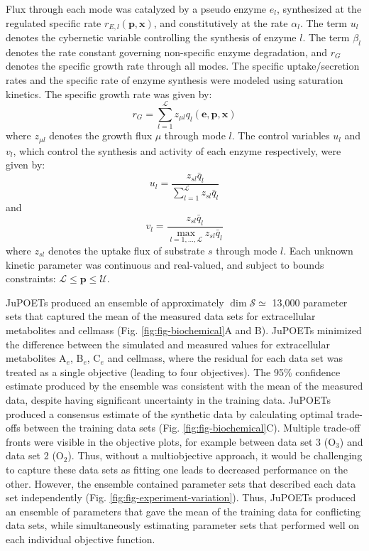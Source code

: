\documentclass{bmcart}
\begin{document}
Flux through each mode was catalyzed by a pseudo enzyme $e_{l}$, synthesized at the regulated specific rate $r_{E,l}\left(\mathbf{p},\mathbf{x}\right)$, and constitutively at the rate $\alpha_{l}$.
The term $u_{l}$ denotes the cybernetic variable controlling the synthesis of enzyme $l$.
The term $\beta_{l}$ denotes the rate constant governing non-specific enzyme degradation, and $r_{G}$ denotes the specific growth rate through all modes.
The specific uptake/secretion rates and the specific rate of enzyme synthesis were modeled using saturation kinetics.
The specific growth rate was given by:
\begin{equation}\nonumber
	r_{G}  = \sum_{l = 1}^{\mathcal{L}}z_{\mu l}q_{l}\left(\mathbf{e},\mathbf{p},\mathbf{x}\right)
\end{equation}
where $z_{\mu l}$ denotes the growth flux $\mu$ through mode $l$.
The control variables $u_{l}$ and $v_{l}$, which control the synthesis and activity of each enzyme respectively, were given by:
\begin{equation}
	u_{l} = \frac{z_{sl}\bar{q}_{l}}{\sum\limits_{l = 1}^{\mathcal{L}}z_{sl}\bar{q}_{l}}
\end{equation}
and
\begin{equation}
    v_{l} = \frac{z_{sl}\bar{q}_{l}}{\max\limits_{l=1,\hdots,\mathcal{L}}z_{sl}\bar{q}_{l}}
\end{equation}
where $z_{sl}$ denotes the uptake flux of substrate $s$ through mode $l$.
Each unknown kinetic parameter was continuous and real-valued, and subject to bounds constraints: $\mathcal{L} \leq \mathbf{p} \leq \mathcal{U}$.


JuPOETs produced an ensemble of approximately $\dim{\mathcal{S}}\simeq$ 13,000 parameter sets that captured the mean of the measured data sets for extracellular metabolites and cellmass
(Fig. \ref{fig:fig-biochemical}A and B). JuPOETs minimized the difference between the simulated and measured values for extracellular metabolites A$_{e}$, B$_{e}$, C$_{e}$ and cellmass,
where the residual for each data set was treated as a single objective (leading to four objectives).
The 95\% confidence estimate produced by the ensemble was consistent with the mean of the measured data, despite having significant
uncertainty in the training data. JuPOETs produced a consensus estimate of the synthetic data by calculating optimal trade-offs between the training data sets (Fig. \ref{fig:fig-biochemical}C). Multiple trade-off fronts were visible in the objective plots, for example between data set 3 (O$_{3}$) and data set 2 (O$_{2}$).
Thus, without a multiobjective approach, it would be challenging to capture these data sets as fitting one leads to decreased performance on the other.
However, the ensemble contained parameter sets that described each data set independently (Fig. \ref{fig:fig-experiment-variation}).
Thus, JuPOETs produced an ensemble of parameters that gave the mean of the training data for conflicting data sets,
while simultaneously estimating parameter sets that performed well on each individual objective function.
\end{document}
